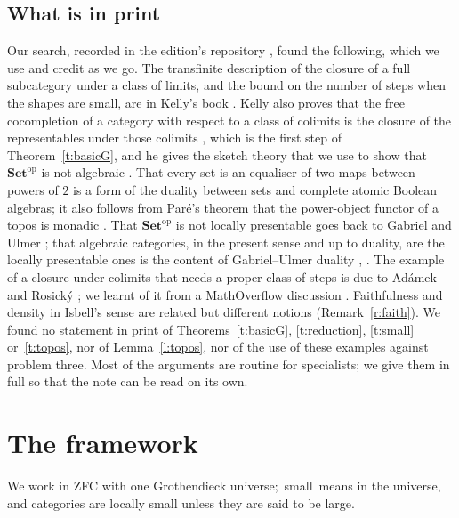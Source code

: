 \documentclass[11pt,a4paper]{amsart}
\theoremstyle{definition}
\theoremstyle{remark}
\newcommand{\q}[1]{\guillemotleft\,#1\,\guillemotright}
\newcommand{\Set}{\mathbf{Set}}
\begin{document}
\subsection*{What is in print}
Our search, recorded in the edition's repository \cite{repo}, found the following, which we use and credit as we go. The transfinite description of the closure of a full subcategory under a class of limits, and the bound on the number of steps when the shapes are small, are in Kelly's book \cite[\S3.5]{kellybook}. Kelly also proves that the free cocompletion of a category with respect to a class of colimits is the closure of the representables under those colimits \cite[Thm~5.35]{kellybook}, which is the first step of Theorem~\ref{t:basicG}, and he gives the sketch theory that we use to show that $\Set^{\mathrm{op}}$ is not algebraic \cite[ch.~6]{kellybook}. That every set is an equaliser of two maps between powers of $2$ is a form of the duality between sets and complete atomic Boolean algebras; it also follows from Paré's theorem that the power-object functor of a topos is monadic \cite{pare}. That $\Set^{\mathrm{op}}$ is not locally presentable goes back to Gabriel and Ulmer \cite{gu}; that algebraic categories, in the present sense and up to duality, are the locally presentable ones is the content of Gabriel--Ulmer duality \cite{gu}, \cite[ch.~1]{ar}. The example of a closure under colimits that needs a proper class of steps is due to Adámek and Rosický \cite[Example~6.38]{ar}; we learnt of it from a MathOverflow discussion \cite{mo}. Faithfulness and density in Isbell's sense \cite{isbell} are related but different notions (Remark~\ref{r:faith}). We found no statement in print of Theorems~\ref{t:basicG}, \ref{t:reduction}, \ref{t:small} or~\ref{t:topos}, nor of Lemma~\ref{l:topos}, nor of the use of these examples against problem three. Most of the arguments are routine for specialists; we give them in full so that the note can be read on its own.

\section{The framework}\label{sec:framework}

We work in ZFC with one Grothendieck universe; \q{small} means in the universe, and categories are locally small unless they are said to be large.
\end{document}
